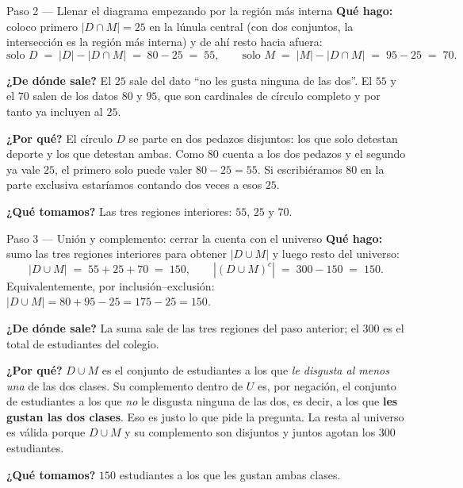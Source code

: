 \documentclass[11pt]{article}
\begin{document}
\begin{paso}{Paso 2 --- Llenar el diagrama empezando por la región más interna}
\textbf{Qué hago:} coloco primero $|D\cap M|=25$ en la lúnula central (con dos conjuntos, la
intersección es la región más interna) y de ahí resto hacia afuera:
\[
\text{solo }D \;=\; |D| - |D\cap M| \;=\; 80-25 \;=\; 55,
\qquad
\text{solo }M \;=\; |M| - |D\cap M| \;=\; 95-25 \;=\; 70.
\]

\begin{center}
\end{center}

\textbf{¿De dónde sale?} El $25$ sale del dato ``no les gusta ninguna de las dos''. El $55$ y el $70$
salen de los datos $80$ y $95$, que son cardinales de círculo completo y por tanto ya incluyen al $25$.

\textbf{¿Por qué?} El círculo $D$ se parte en dos pedazos disjuntos: los que solo detestan deporte y los
que detestan ambas. Como $80$ cuenta a los dos pedazos y el segundo ya vale $25$, el primero solo puede
valer $80-25=55$. Si escribiéramos $80$ en la parte exclusiva estaríamos contando dos veces a esos $25$.

\textbf{¿Qué tomamos?} Las tres regiones interiores: $55$, $25$ y $70$.
\end{paso}

\begin{paso}{Paso 3 --- Unión y complemento: cerrar la cuenta con el universo}
\textbf{Qué hago:} sumo las tres regiones interiores para obtener $|D\cup M|$ y luego resto del universo:
\[
|D\cup M| \;=\; 55+25+70 \;=\; 150,
\qquad
|(D\cup M)^{c}| \;=\; 300-150 \;=\; 150.
\]
Equivalentemente, por inclusión--exclusión: $|D\cup M|=80+95-25=175-25=150$.

\textbf{¿De dónde sale?} La suma sale de las tres regiones del paso anterior; el $300$ es el total de
estudiantes del colegio.

\textbf{¿Por qué?} $D\cup M$ es el conjunto de estudiantes a los que \emph{le disgusta al menos una} de
las dos clases. Su complemento dentro de $U$ es, por negación, el conjunto de estudiantes a los que
\emph{no} le disgusta ninguna de las dos, es decir, a los que \textbf{les gustan las dos clases}. Eso es
justo lo que pide la pregunta. La resta al universo es válida porque $D\cup M$ y su complemento son
disjuntos y juntos agotan los 300 estudiantes.

\textbf{¿Qué tomamos?} $150$ estudiantes a los que les gustan ambas clases.
\end{paso}
\end{document}
